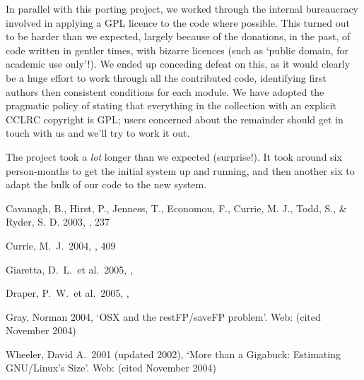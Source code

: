 \documentclass[11pt,twoside]{article}
\begin{document}
In parallel with this porting project, we worked through the internal
bureaucracy involved in applying a GPL licence to the code where
possible.  This turned out to be harder than we expected, largely
because of the donations, in the past, of code written in gentler
times, with bizarre licences (such as `public domain, for academic use
only'!).  We ended up conceding defeat on this, as it would clearly be
a huge effort to work through all the contributed code, identifying
first authors then consistent conditions for each module.  We have
adopted the pragmatic policy of stating that everything in the
collection with an explicit CCLRC copyright is GPL; users concerned
about the remainder should get in touch with us and we'll try to work
it out.

The project took a \emph{lot} longer than we expected (surprise!).  It
took around six person-months to get the initial system up and
running, and then another six to adapt the bulk of our code to the new
system.



\begin{references}

  Cavanagh, B., Hirst, P., Jenness, T., Economou, F.,
Currie, M. J., Todd, S., \& Ryder, S. D. 2003, \adassxii, 237

 Currie, M.\ J.\ 2004, \adassxiii, 409

 Giaretta, D.\ L.\ et al.\ 2005, \adassxiv, 

 Draper, P.\ W.\ et al.\ 2005, \adassxiv, 

 Gray, Norman 2004, `OSX and the restFP/saveFP problem'.
Web: 
(cited November 2004)

 Wheeler, David A.\ 2001 (updated 2002), `More than a
Gigabuck: Estimating GNU/Linux's Size'.
Web: 
(cited November 2004)

\end{references}
\end{document}
